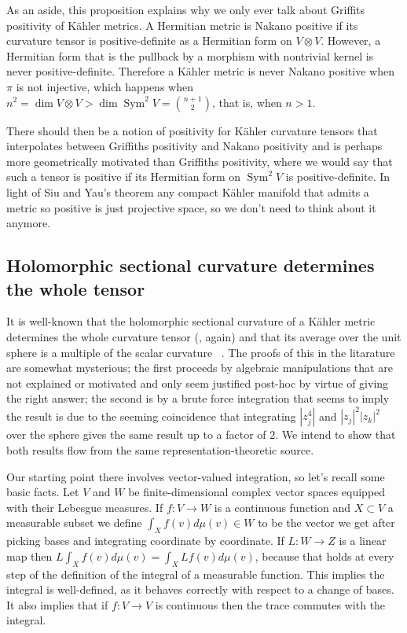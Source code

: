 \documentclass[10pt,a4paper]{amsart}
\theoremstyle{definition}
\DeclareMathOperator{\Sym}{Sym}
\begin{document}
As an aside, this proposition explains why we only ever talk about Griffits
positivity of K\"ahler metrics.
A Hermitian metric is Nakano positive if its curvature tensor is
positive-definite as a Hermitian form on $V \otimes V$.
However, a Hermitian form that is the pullback by a morphism with nontrivial
kernel is never positive-definite.
Therefore a K\"ahler metric is never Nakano positive when $\pi$ is not
injective, which happens when
$n^2 = \dim V \otimes V > \dim \Sym^2 V = \binom {n+1}2$,
that is, when $n > 1$.

There should then be a notion of positivity for K\"ahler curvature tensors that
interpolates between Griffiths positivity and Nakano positivity and is perhaps
more geometrically motivated than Griffiths positivity, where we would say that
such a tensor is positive if its Hermitian form on $\Sym^2 V$ is
positive-definite.
In light of Siu and Yau's theorem any compact K\"ahler manifold that
admits a metric so positive is just projective space, so we don't need to think
about it anymore.



\subsection*{Holomorphic sectional curvature determines the whole tensor}

It is well-known that the holomorphic sectional curvature of a K\"ahler metric
determines the whole curvature tensor (\cite{zheng2000complex}, again) and that
its average over the unit sphere is a multiple of the scalar curvature~
\cite{berger1965varietes,zheng2000complex,diverio2020kobayashi}.
The proofs of this in the litarature are somewhat mysterious;
the first proceeds by algebraic manipulations that are not explained or
motivated and only seem justified post-hoc by virtue of giving the right answer;
the second is by a brute force integration that seems to imply the result is
due to the seeming coincidence that integrating $|z_j^4|$ and $|z_j|^2 |z_k|^2$
over the sphere gives the same result up to a factor of 2.
We intend to show that both results flow from the same representation-theoretic
source.


Our starting point there involves vector-valued integration, so let's recall
some basic facts.
Let $V$ and $W$ be finite-dimensional complex vector spaces equipped with their
Lebesgue measures.
If $f : V \to W$ is a continuous function and $X \subset V$ a measurable subset
we define $\int_X f(v) d\mu(v) \in W$ to be the vector we get after picking
bases and integrating coordinate by coordinate.
If $L : W \to Z$ is a linear map then $L \int_X f(v) d\mu(v) = \int_X Lf(v)
d\mu(v)$, because that holds at every step of the definition of the integral of
a measurable function.
This implies the integral is well-defined, as it behaves correctly with respect
to a change of bases.
It also implies that if $f : V \to V$ is continuous then the trace commutes
with the integral.
\end{document}
